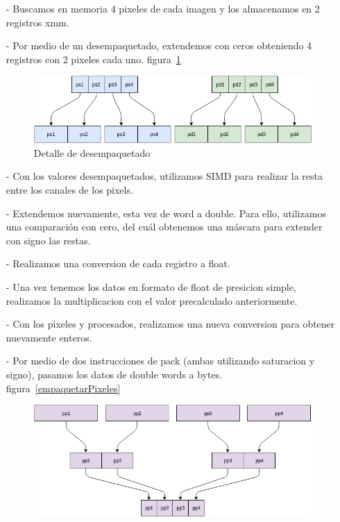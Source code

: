 \documentclass[a4paper]{article}
\begin{document}
\begin{itemize}
    \itemsep0em
    \item[-]
        Buscamos en memoria 4 pixeles de cada imagen y los almacenamos en 2 registros xmm.
    \item[-]
        Por medio de un desempaquetado, extendemos con ceros obteniendo 4 registros con 2 pixeles cada uno. figura~\ref{extenderPixeles}
        \begin{figure}[!htb]
          \begin{center}
        	\includegraphics[scale=0.4]{imagenes/diagramas/combinar/extenderPixeles.png}
        	\caption{Detalle de desempaquetado}
        	\label{extenderPixeles}
          \end{center}
        \end{figure}
    \item[-]
        Con los valores desempaquetados, utilizamos SIMD para realizar la resta entre los canales de los pixels.
    \item[-]
        Extendemos nuevamente, esta vez de word a double. Para ello, utilizamos una comparación con cero, del cuál obtenemos una máscara para extender con signo las restas.
    \item[-]
        Realizamos una conversion de cada registro a float.
    \item[-]
        Una vez tenemos los datos en formato de float de presicion simple, realizamos la multiplicacion con el valor precalculado anteriormente.
    \item[-]
        Con los pixeles y procesados, realizamos una nueva conversion para obtener nuevamente enteros.
    \item[-]
        Por medio de dos instrucciones de pack (ambas utilizando saturacion y signo), pasamos los datos de double words a bytes. figura~\ref{empaquetarPixeles}
        \begin{figure}[!htb]
          \begin{center}
        	\includegraphics[scale=0.4]{imagenes/diagramas/combinar/empaquetarPixeles.png}

\end{center}
\end{figure}
\end{itemize}
\end{document}
